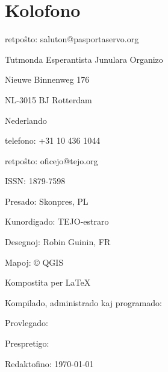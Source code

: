 
\section{Kolofono}

retpoŝto:	 saluton@pasportaservo.org


Tutmonda Esperantista Junulara Organizo

Nieuwe Binnenweg 176

NL-3015 BJ Rotterdam

Nederlando

telefono:   +31 10 436 1044

retpoŝto:   oficejo@tejo.org


ISSN: 1879-7598

Presado: Skonpres, PL

Kunordigado: TEJO-estraro

Desegnoj: Robin Guinin, FR

Mapoj:  © QGIS

\newfontfamily{}
Kompostita per {\cmr \LaTeX}

Kompilado, administrado kaj programado: 


Provlegado: 

Prespretigo: 

Redaktofino: \today

